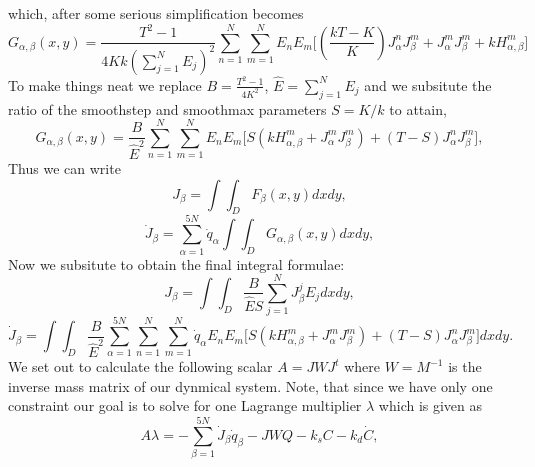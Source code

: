 which, after some serious simplification becomes
\begin{equation*}
    G_{\alpha, \beta}(x,y) = \frac{T^2-1}{4Kk \left(\sum_{j=1}^N E_j\right)^2} \sum_{n=1}^N \sum_{m=1}^N E_n E_m \bigg[ \left( \frac{kT-K}{K}\right) J_\alpha^n J_\beta^m +J_\alpha^m J_\beta^m +k H_{\alpha, \beta}^m \bigg]
\end{equation*}
To make things neat we replace $B = \frac{T^2-1}{4K^2}$, $\hat{E} = \sum_{j=1}^N E_j$ and we subsitute the ratio of the smoothstep and smoothmax parameters
$S = K/k$ to attain,
\begin{equation*}
    G_{\alpha, \beta}(x,y) = \frac{B}{\hat{E}^2} \sum_{n=1}^N \sum_{m=1}^N E_n E_m \bigg[   S(k H_{\alpha, \beta}^m +J_\alpha^m J_\beta^m )+ (T-S)J_\alpha^n J_\beta^m\bigg],
\end{equation*}
Thus we can write 
\begin{equation*}
    J_\beta =  \int \int_D F_{\beta}(x,y) dx dy,
\end{equation*}
\begin{equation*}
    \dot{J}_\beta =\sum_{\alpha=1}^{5N}\dot{q}_\alpha \int \int_D G_{\alpha, \beta}(x,y) dx dy,
\end{equation*}
Now we subsitute to obtain the final integral formulae:
\begin{equation*}
    J_\beta =  \int \int_D \frac{B}{\hat{E}S} \sum_{j=1}^N J_\beta^j E_j dx dy,
\end{equation*}
\begin{equation*}
    \dot{J}_\beta = \int \int_D \frac{B}{\hat{E}^2}  \sum_{\alpha=1}^{5N}  \sum_{n=1}^N \sum_{m=1}^N \dot{q}_\alpha E_n E_m \bigg[   S(k H_{\alpha, \beta}^m +J_\alpha^m J_\beta^m )+ (T-S)J_\alpha^n J_\beta^m\bigg] dx dy.
\end{equation*}
We set out to calculate the following scalar $A = JWJ^t$ where $W = M^{-1}$ is the inverse mass matrix of our dynmical system. Note, that since we have 
only one constraint our goal is to solve for one Lagrange multiplier $\lambda$ which is given as 
\begin{equation*}
A \lambda = - \sum_{\beta =1 }^{5N }\dot{J}_\beta \dot{q}_\beta - JWQ -k_s C -k_d \dot{C},
\end{equation*}

